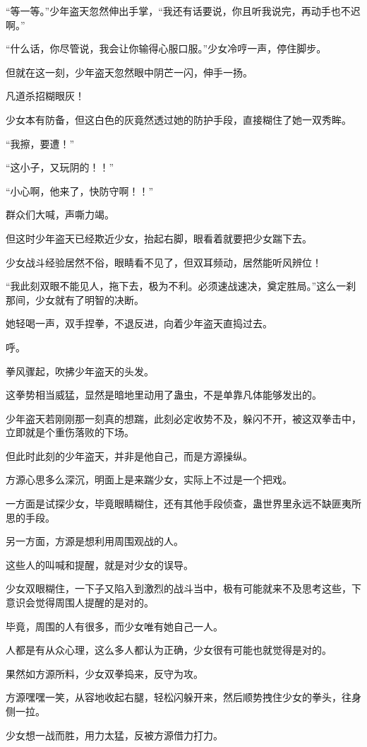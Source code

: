 \begin{this_body}
“等一等。”少年盗天忽然伸出手掌，“我还有话要说，你且听我说完，再动手也不迟啊。”

“什么话，你尽管说，我会让你输得心服口服。”少女冷哼一声，停住脚步。

但就在这一刻，少年盗天忽然眼中阴芒一闪，伸手一扬。

凡道杀招糊眼灰！

少女本有防备，但这白色的灰竟然透过她的防护手段，直接糊住了她一双秀眸。

“我擦，要遭！”

“这小子，又玩阴的！！”

“小心啊，他来了，快防守啊！！”

群众们大喊，声嘶力竭。

但这时少年盗天已经欺近少女，抬起右脚，眼看着就要把少女踹下去。

少女战斗经验居然不俗，眼睛看不见了，但双耳频动，居然能听风辨位！

“我此刻双眼不能见人，拖下去，极为不利。必须速战速决，奠定胜局。”这么一刹那间，少女就有了明智的决断。

她轻喝一声，双手捏拳，不退反进，向着少年盗天直捣过去。

呼。

拳风骤起，吹拂少年盗天的头发。

这拳势相当威猛，显然是暗地里动用了蛊虫，不是单靠凡体能够发出的。

少年盗天若刚刚那一刻真的想踹，此刻必定收势不及，躲闪不开，被这双拳击中，立即就是个重伤落败的下场。

但此时此刻的少年盗天，并非是他自己，而是方源操纵。

方源心思多么深沉，明面上是来踹少女，实际上不过是一个把戏。

一方面是试探少女，毕竟眼睛糊住，还有其他手段侦查，蛊世界里永远不缺匪夷所思的手段。

另一方面，方源是想利用周围观战的人。

这些人的叫喊和提醒，就是对少女的误导。

少女双眼糊住，一下子又陷入到激烈的战斗当中，极有可能就来不及思考这些，下意识会觉得周围人提醒的是对的。

毕竟，周围的人有很多，而少女唯有她自己一人。

人都是有从众心理，这么多人都认为正确，少女很有可能也就觉得是对的。

果然如方源所料，少女双拳捣来，反守为攻。

方源嘿嘿一笑，从容地收起右腿，轻松闪躲开来，然后顺势拽住少女的拳头，往身侧一拉。

少女想一战而胜，用力太猛，反被方源借力打力。


\end{this_body}
